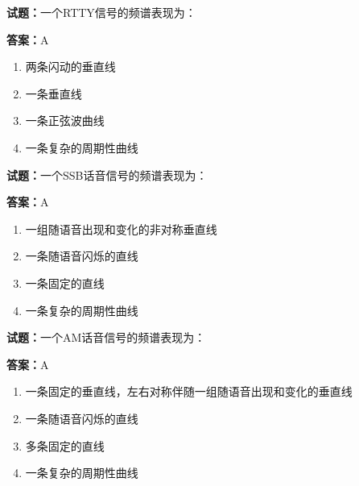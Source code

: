 \documentclass{ctexbook}
\begin{document}




\vspace{1em}

\textbf{试题：}一个RTTY信号的频谱表现为： 

\textbf{答案：}A 

\begin{enumerate}[leftmargin=3em]
  \item 两条闪动的垂直线 

  \item 一条垂直线 

  \item 一条正弦波曲线 

  \item 一条复杂的周期性曲线 

\end{enumerate}





\vspace{1em}

\textbf{试题：}一个SSB话音信号的频谱表现为： 

\textbf{答案：}A 

\begin{enumerate}[leftmargin=3em]
  \item 一组随语音出现和变化的非对称垂直线 

  \item 一条随语音闪烁的直线 

  \item 一条固定的直线 

  \item 一条复杂的周期性曲线 

\end{enumerate}





\vspace{1em}

\textbf{试题：}一个AM话音信号的频谱表现为： 

\textbf{答案：}A 

\begin{enumerate}[leftmargin=3em]
  \item 一条固定的垂直线，左右对称伴随一组随语音出现和变化的垂直线 

  \item 一条随语音闪烁的直线 

  \item 多条固定的直线 

  \item 一条复杂的周期性曲线 

\end{enumerate}
\end{document}
